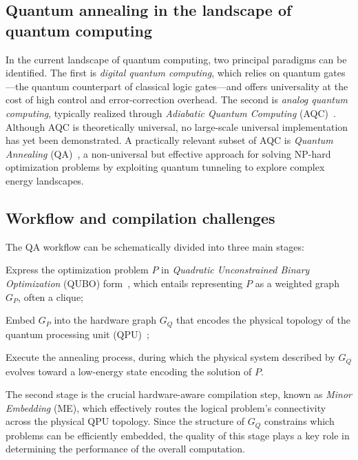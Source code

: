 \documentclass[11pt,acmsmall,nonacm]{acmart}
\begin{document}
\subsection{Quantum annealing in the landscape of quantum computing}

In the current landscape of quantum computing, two principal paradigms can be identified.
The first is \emph{digital quantum computing}, which relies on quantum gates—the quantum counterpart of classical logic gates—and offers universality at the cost of high control and error-correction overhead.
The second is \emph{analog quantum computing}, typically realized through \emph{Adiabatic Quantum Computing} (AQC)~\cite{AQC}.
Although AQC is theoretically universal, no large-scale universal implementation has yet been demonstrated.
A practically relevant subset of AQC is \emph{Quantum Annealing} (QA)~\cite{QA}, a non-universal but effective approach for solving NP-hard optimization problems by exploiting quantum tunneling to explore complex energy landscapes.

\subsection{Workflow and compilation challenges}

The QA workflow can be schematically divided into three main stages:
\begin{enumerate*}
  \item Express the optimization problem $P$ in \emph{Quadratic Unconstrained Binary Optimization} (QUBO) form~\cite{lucas}, which entails representing $P$ as a weighted graph $G_P$, often a clique;
  \item Embed $G_P$ into the hardware graph $G_Q$ that encodes the physical topology of the quantum processing unit (QPU)~\cite{ME, MEdwave, MENP, localembedding};
  \item Execute the annealing process, during which the physical system described by $G_Q$ evolves toward a low-energy state encoding the solution of $P$.
\end{enumerate*}

The second stage is the crucial hardware-aware compilation step, known as \emph{Minor Embedding} (ME), which effectively routes the logical problem's connectivity across the physical QPU topology.
Since the structure of $G_Q$ constrains which problems can be efficiently embedded, the quality of this stage plays a key role in determining the performance of the overall computation.
\end{document}
